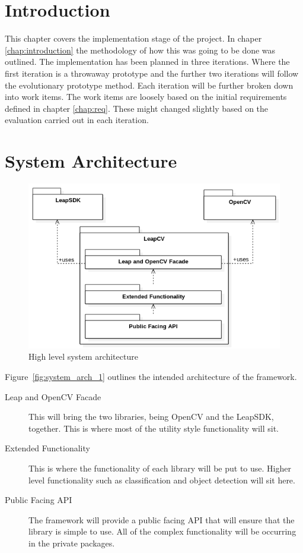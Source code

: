\documentclass[11pt,oneside]{report}
\begin{document}
	\section{Introduction}
	This chapter covers the implementation stage of the project.
	In chaper \ref{chap:introduction} the methodology of how this was going to be done was outlined.
	The implementation has been planned in three iterations.
	Where the first iteration is a throwaway prototype and the further two iterations will follow the evolutionary prototype method.
	Each iteration will be further broken down into work items.
	The work items are loosely based on the initial requirements defined in chapter \ref{chap:req}.
	These might changed slightly based on the evaluation carried out in each iteration.
	\clearpage
	\section{System Architecture}
	\begin{figure}[ht]
			\begin{center}
    			\includegraphics[scale=0.65]{system_architecture_2}
    			\caption{High level system architecture \protect {\label{fig:system_arch_1}}}
    		\end{center}
			\end{figure}	
			
			Figure~\ref{fig:system_arch_1} outlines the intended architecture of the framework.
			\begin{description}
			\item[Leap and OpenCV Facade] This will bring the two libraries, being OpenCV and the LeapSDK, together.
			This is where most of the utility style functionality will sit.
			\item[Extended Functionality] This is where the functionality of each library will be put to use.
			Higher level functionality such as classification and object detection will sit here.
			\item[Public Facing API] The framework will provide a public facing API that will ensure that the library is simple to use.
			All of the complex functionality will be occurring in the private packages.
			\end{description}
			\clearpage
\end{document}
